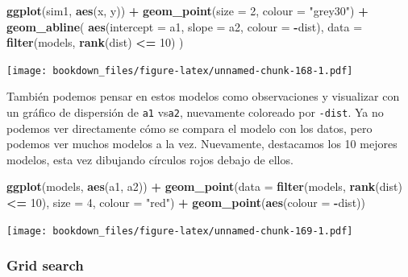 \documentclass[]{book}
\newenvironment{Shaded}{\begin{snugshade}}{\end{snugshade}}
\newcommand{\DataTypeTok}[1]{\textcolor[rgb]{0.13,0.29,0.53}{#1}}
\newcommand{\DecValTok}[1]{\textcolor[rgb]{0.00,0.00,0.81}{#1}}
\newcommand{\KeywordTok}[1]{\textcolor[rgb]{0.13,0.29,0.53}{\textbf{#1}}}
\newcommand{\NormalTok}[1]{#1}
\newcommand{\OperatorTok}[1]{\textcolor[rgb]{0.81,0.36,0.00}{\textbf{#1}}}
\newcommand{\StringTok}[1]{\textcolor[rgb]{0.31,0.60,0.02}{#1}}
\begin{document}
\begin{Shaded}
\begin{Highlighting}[]
\KeywordTok{ggplot}\NormalTok{(sim1, }\KeywordTok{aes}\NormalTok{(x, y)) }\OperatorTok{+}\StringTok{ }
\StringTok{  }\KeywordTok{geom_point}\NormalTok{(}\DataTypeTok{size =} \DecValTok{2}\NormalTok{, }\DataTypeTok{colour =} \StringTok{"grey30"}\NormalTok{) }\OperatorTok{+}\StringTok{ }
\StringTok{  }\KeywordTok{geom_abline}\NormalTok{(}
    \KeywordTok{aes}\NormalTok{(}\DataTypeTok{intercept =}\NormalTok{ a1, }\DataTypeTok{slope =}\NormalTok{ a2, }\DataTypeTok{colour =} \OperatorTok{-}\NormalTok{dist), }
    \DataTypeTok{data =} \KeywordTok{filter}\NormalTok{(models, }\KeywordTok{rank}\NormalTok{(dist) }\OperatorTok{<=}\StringTok{ }\DecValTok{10}\NormalTok{)}
\NormalTok{  )}
\end{Highlighting}
\end{Shaded}

\texttt{[image: bookdown\_files/figure-latex/unnamed-chunk-168-1.pdf]}

También podemos pensar en estos modelos como observaciones y visualizar con un gráfico de dispersión de \texttt{a1} vs\texttt{a2}, nuevamente coloreado por \texttt{-dist}. Ya no podemos ver directamente cómo se compara el modelo con los datos, pero podemos ver muchos modelos a la vez. Nuevamente, destacamos los 10 mejores modelos, esta vez dibujando círculos rojos debajo de ellos.

\begin{Shaded}
\begin{Highlighting}[]
\KeywordTok{ggplot}\NormalTok{(models, }\KeywordTok{aes}\NormalTok{(a1, a2)) }\OperatorTok{+}
\StringTok{  }\KeywordTok{geom_point}\NormalTok{(}\DataTypeTok{data =} \KeywordTok{filter}\NormalTok{(models, }\KeywordTok{rank}\NormalTok{(dist) }\OperatorTok{<=}\StringTok{ }\DecValTok{10}\NormalTok{), }\DataTypeTok{size =} \DecValTok{4}\NormalTok{, }\DataTypeTok{colour =} \StringTok{"red"}\NormalTok{) }\OperatorTok{+}
\StringTok{  }\KeywordTok{geom_point}\NormalTok{(}\KeywordTok{aes}\NormalTok{(}\DataTypeTok{colour =} \OperatorTok{-}\NormalTok{dist))}
\end{Highlighting}
\end{Shaded}

\texttt{[image: bookdown\_files/figure-latex/unnamed-chunk-169-1.pdf]}

\hypertarget{grid-search}{%
\subsubsection{Grid search}\label{grid-search}}
\end{document}
